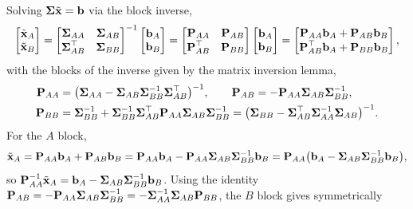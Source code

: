 Solving $\vect{\Sigma}\tilde{\vect{x}} = \vect{b}$ via the block inverse,
\begin{align}
\begin{bmatrix} \tilde{\vect{x}}_A \\ \tilde{\vect{x}}_B \end{bmatrix}
= \begin{bmatrix} \vect{\Sigma}_{AA} & \vect{\Sigma}_{AB} \\ \vect{\Sigma}_{AB}\trans & \vect{\Sigma}_{BB} \end{bmatrix}^{-1}
\begin{bmatrix} \vect{b}_A \\ \vect{b}_B \end{bmatrix}
= \begin{bmatrix} \vect{P}_{AA} & \vect{P}_{AB} \\ \vect{P}_{AB}\trans & \vect{P}_{BB} \end{bmatrix}
\begin{bmatrix} \vect{b}_A \\ \vect{b}_B \end{bmatrix}
= \begin{bmatrix} \vect{P}_{AA}\vect{b}_A + \vect{P}_{AB}\vect{b}_B \\ \vect{P}_{AB}\trans\vect{b}_A + \vect{P}_{BB}\vect{b}_B \end{bmatrix},
\end{align}
with the blocks of the inverse given by the matrix inversion lemma,
\begin{align}
\vect{P}_{AA} &= \big(\vect{\Sigma}_{AA} - \vect{\Sigma}_{AB}\vect{\Sigma}_{BB}^{-1}\vect{\Sigma}_{AB}\trans\big)^{-1}, \qquad
\vect{P}_{AB} = -\vect{P}_{AA}\vect{\Sigma}_{AB}\vect{\Sigma}_{BB}^{-1}, \\
\vect{P}_{BB} &= \vect{\Sigma}_{BB}^{-1} + \vect{\Sigma}_{BB}^{-1}\vect{\Sigma}_{AB}\trans\vect{P}_{AA}\vect{\Sigma}_{AB}\vect{\Sigma}_{BB}^{-1}
= \big(\vect{\Sigma}_{BB} - \vect{\Sigma}_{AB}\trans\vect{\Sigma}_{AA}^{-1}\vect{\Sigma}_{AB}\big)^{-1}.
\end{align}
For the $A$ block,
\begin{align}
\tilde{\vect{x}}_A = \vect{P}_{AA}\vect{b}_A + \vect{P}_{AB}\vect{b}_B
= \vect{P}_{AA}\vect{b}_A - \vect{P}_{AA}\vect{\Sigma}_{AB}\vect{\Sigma}_{BB}^{-1}\vect{b}_B
= \vect{P}_{AA}\big(\vect{b}_A - \vect{\Sigma}_{AB}\vect{\Sigma}_{BB}^{-1}\vect{b}_B\big),
\end{align}
so $\vect{P}_{AA}^{-1}\tilde{\vect{x}}_A = \vect{b}_A - \vect{\Sigma}_{AB}\vect{\Sigma}_{BB}^{-1}\vect{b}_B$. Using the identity $\vect{P}_{AB} = -\vect{P}_{AA}\vect{\Sigma}_{AB}\vect{\Sigma}_{BB}^{-1} = -\vect{\Sigma}_{AA}^{-1}\vect{\Sigma}_{AB}\vect{P}_{BB}$, the $B$ block gives symmetrically
